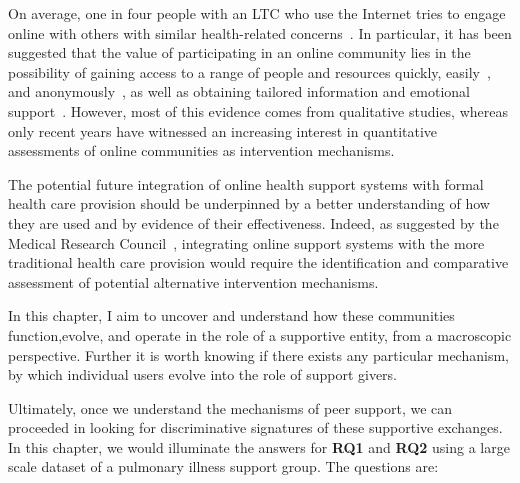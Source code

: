 On average, one in four people with an LTC who use the Internet tries to engage online with others with similar health-related concerns~\cite{fox2011social}. In particular, it has been suggested that the value of participating in an online community lies in the possibility of gaining access to a range of people and resources quickly, easily~\cite{armstrong2000real}, and anonymously~\cite{pendry2015individual}, as well as obtaining tailored information and emotional support~\cite{ali2015online,de2017adolescents,shoebotham2016therapeutic,coulson2005receiving,de2016stroke}. However, most of this evidence comes from qualitative studies, whereas only recent years have witnessed an increasing interest in quantitative assessments of online communities as intervention mechanisms. 

The potential future integration of online health support systems with formal health care provision should be underpinned by a better understanding of how they are used and by evidence of their effectiveness. Indeed, as suggested by the Medical Research Council~\cite{Craiga1655}, integrating online support systems with the more traditional health care provision would require the identification and comparative assessment of potential alternative intervention mechanisms.

In this chapter, I aim to uncover and understand how these communities function,evolve, and operate in the role of a supportive entity, from a macroscopic perspective.
Further it is worth knowing if there exists any particular mechanism, by which individual users evolve into the role of support givers.

Ultimately, once we understand the mechanisms of peer support, we can proceeded in looking for discriminative signatures of these supportive exchanges.
In this chapter, we would illuminate the answers for \textbf{RQ1} and \textbf{RQ2} using a large scale dataset of a pulmonary illness support group. The questions are: 

\noindent{}


